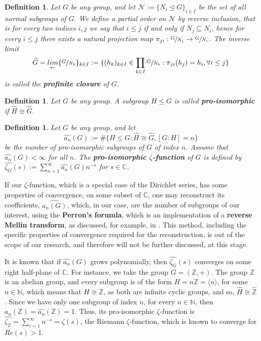 \documentclass[12pt]{article}
\newtheorem{definition}[theorem]{Definition}
\begin{document}
\begin{definition}
\label{def:profinite.closure}
Let $G$ be any group, and let $\mathcal{N}:=\{N_i\trianglelefteq G\}_{i\in I}$ be the set of all normal subgroups of $G$. We define a partial order on $\mathcal{N}$ by reverse inclusion, that is for every two indices $i,j$ we say that $i\leq j$ if and only if $N_j\subseteq N_i$, hence for every $i\leq j$ there exists a natural projection map $\pi_{ji}:\sfrac{G}{N_
j}\rightarrow\sfrac{G}{N_i}$. The inverse limit \[\widehat{G}=\underset{\leftarrow}{lim}\{\sfrac{G}{N_k}\}_{k\in I}:=\{(h_k)_{k\in I}\in\prod_{k\in I}\sfrac{G}{N_k} : \pi_{ji}(h_j)=h_i,\forall i\leq j\}\] is called the \textbf{profinite closure} of $G$.
\end{definition}
\begin{definition}
\label{def:pro.isomorphic}
Let $G$ be any group. A subgroup $H\leq G$ is called \textbf{pro-isomorphic} if $\widehat{H}\cong\widehat{G}$.
\end{definition}
\begin{definition}
\label{def:zeta.pro.isomorphic}
Let $G$ be any group, and let \[\hat{a_n}(G):=\#\{H\leq G : \widehat{H}\cong\widehat{G}, [G:H]=n\}\] be the number of pro-isomorphic subgroups of $G$ of index $n$. Assume that $\hat{a_n}(G)<\infty$ for all $n$. The \textbf{pro-isomorphic $\zeta$-function} of $G$ is defined by $\hat{\zeta_G}(s):=\sum_{n=1}^{\infty}\hat{a_n}(G)n^{-s}$ for $s\in\mathbb{C}$.
\end{definition}
If our $\zeta$-function, which is a special case of the Dirichlet series, has some properties of convergence, on some subset of $\mathbb{C}$, one may reconstruct its coefficients, $\hat{a_n(G)}$, which, in our case, are the number of subgroups of our interest, using the \textbf{Perron's forumla}, which is an implementation of a \textbf{reverse Mellin transform}, as discussed, for example, in \cite{MontgomeryVaughan}. This method, including the specific properties of convergence required for the reconstruction, is out of the scope of our research, and therefore will not be further discussed, at this stage.\par
It is known that if $\hat{a_n}(G)$ grows polynomially, then $\hat{\zeta_G}(s)$ converges on some right half-plane of $\mathbb{C}$. For instance, we take the group $G=(\mathbb{Z},+)$. The group $\mathbb{Z}$ is an abelian group, and every subgroup is of the form $H=n\mathbb{Z}=\langle n\rangle$, for some $n\in\mathbb{N}$, which means that $H\cong \mathbb{Z}$, as both are infinite cyclic groups, and so, $\widehat{H}\cong\widehat{\mathbb{Z}}$. Since we have only one subgroup of index $n$, for every $n\in\mathbb{N}$, then $a_n(\mathbb{Z})=\hat{a_n}(\mathbb{Z})=1$. Thus, its pro-isomorphic $\zeta$-function is $\hat{\zeta_{\mathbb{Z}}}=\sum_{i=1}^{\infty}n^{-s}=\zeta(s)$, the Riemann $\zeta$-function, which is known to converge for $Re(s)>1$.\par
\end{document}
